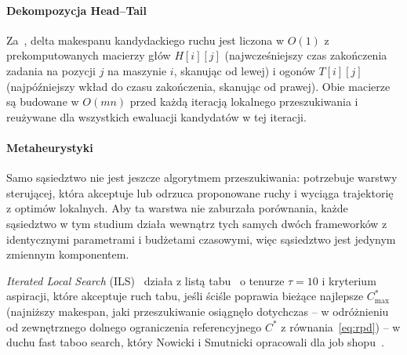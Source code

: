 \documentclass[11pt,a4paper]{article}
\begin{document}
\paragraph{Dekompozycja Head--Tail}
Za~\citep{wodecki04}, delta makespanu kandydackiego ruchu jest liczona
w $O(1)$ z prekomputowanych macierzy głów $H[i][j]$ (najwcześniejszy
czas zakończenia zadania na pozycji $j$ na maszynie $i$, skanując od
lewej) i ogonów $T[i][j]$ (najpóźniejszy wkład do czasu zakończenia,
skanując od prawej). Obie macierze są budowane w $O(mn)$ przed każdą
iteracją lokalnego przeszukiwania i reużywane dla wszystkich ewaluacji
kandydatów w tej iteracji.

\paragraph{Metaheurystyki}
Samo sąsiedztwo nie jest jeszcze algorytmem przeszukiwania: potrzebuje
warstwy sterującej, która akceptuje lub odrzuca proponowane ruchy
i wyciąga trajektorię z optimów lokalnych. Aby ta warstwa nie zaburzała
porównania, każde sąsiedztwo w tym studium działa wewnątrz tych samych
dwóch frameworków z identycznymi parametrami i budżetami czasowymi,
więc sąsiedztwo jest jedynym zmiennym komponentem.

\emph{Iterated Local Search} (ILS)~\citep{lourenco2003iterated} działa
z listą tabu~\citep{glover1989} o tenurze $\tau=10$ i kryterium
aspiracji, które akceptuje ruch tabu, jeśli ściśle poprawia bieżące
najlepsze $C_{\max}^*$ (najniższy makespan, jaki przeszukiwanie
osiągnęło dotychczas -- w odróżnieniu od zewnętrznego dolnego
ograniczenia referencyjnego $C^*$ z równania~\eqref{eq:rpd}) -- w duchu fast taboo
search, który Nowicki i Smutnicki opracowali dla job
shopu~\citep{nowicki96ms}.
\end{document}
